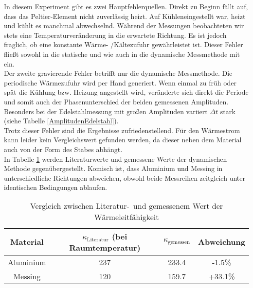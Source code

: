 In diesem Experiment gibt es zwei Hauptfehlerquellen. Direkt zu Beginn fällt auf, dass das Peltier-Element nicht zuverlässig heizt. Auf \glqq Kühlen\grqq ein\-ge\-stel\-lt war, heizt und kühlt es manchmal abwechselnd. Während der Messungen beobachteten wir stets eine Temperaturveränderung in die erwartete Richtung. Es ist jedoch fraglich, ob eine konstante Wärme- /Kältezufuhr gewährleistet ist. Dieser Fehler fließt sowohl in die statische und wie auch in die dynamische Messmethode mit ein. \\
Der zweite gravierende Fehler betrifft nur die dynamische Messmethode. Die periodische Wärmezufuhr wird per Hand generiert. Wenn einmal zu früh oder spät die Kühlung bzw. Heizung angestellt wird, veränderte sich direkt die Periode und somit auch der Phasenunterschied der beiden gemessenen Amplituden. Besonders bei der Edelstahlmessung mit großen Amplituden variiert $\Delta t$ stark (siehe Tabelle \ref{AmplitudenEdelstahl}). \\
Trotz dieser Fehler sind die Ergebnisse zufriedenstellend. 
Für den Wärmestrom kann leider kein Vergleichswert gefunden werden, da dieser neben dem Material auch von der Form des Stabes abhängt. \\ 
In Tabelle \ref{Literaturwert} werden Literaturwerte und gemessene Werte der dynamischen Methode gegenübergestellt. Komisch ist, dass Aluminium und Messing in unterschiedliche Richtungen abweichen, obwohl beide Messreihen zeitgleich unter identischen Bedingungen ablaufen.



\begin{table}[h!]
\begin{center}
\begin{tabular}{c|c|c|c}
	Material & $\kappa_\text{Literatur}$ (bei Raumtemperatur) & $\kappa_\text{gemessen}$  & Abweichung \\
\hline
Aluminium & 237 & 233.4 & -1.5\% \\
Messing & 120 & 159.7 & +33.1\% \\
\end{tabular}
\end{center}
\caption[Vergleich zwischen Literatur- und gemessenem Wert der Wärmeleitfähigkeit]{Vergleich zwischen Literatur-\footnotemark\ und gemessenem Wert der Wärmeleitfähigkeit}
\label{Literaturwert}
\end{table}
